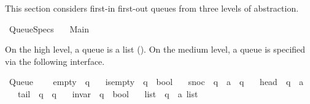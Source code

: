 %
\begin{isabellebody}%
%
%
\isadelimdocument
%
\endisadelimdocument
%
\isatagdocument
%
\isamarkuptrue%
%
\endisatagdocument
{\isafolddocument}%
%
\isadelimdocument
%
\endisadelimdocument
%
\begin{isamarkuptext}%
This section considers first-in first-out queues from three levels of abstraction.%
\end{isamarkuptext}\isamarkuptrue%
%
\isadelimtheory
%
\endisadelimtheory
%
\isatagtheory
{}\isamarkupfalse%
\ Queue{\isacharunderscore}{\kern0pt}Specs\isanewline
\ \ \ Main\isanewline
{}%
\endisatagtheory
{\isafoldtheory}%
%
\isadelimtheory
%
\endisadelimtheory
%
\begin{isamarkuptext}%
On the high level, a queue is a list (). On the medium level, a queue is specified via
the following interface.%
\end{isamarkuptext}\isamarkuptrue%
\isamarkupfalse%
\ Queue\ {\isacharequal}{\kern0pt}\isanewline
\ \ \ empty\ {\isacharcolon}{\kern0pt}{\isacharcolon}{\kern0pt}\ {\isachardoublequoteopen}{\isacharprime}{\kern0pt}q{\isachardoublequoteclose}\isanewline
\ \ \ is{\isacharunderscore}{\kern0pt}empty\ {\isacharcolon}{\kern0pt}{\isacharcolon}{\kern0pt}\ {\isachardoublequoteopen}{\isacharprime}{\kern0pt}q\ {\isasymRightarrow}\ bool{\isachardoublequoteclose}\isanewline
\ \ \ snoc\ {\isacharcolon}{\kern0pt}{\isacharcolon}{\kern0pt}\ {\isachardoublequoteopen}{\isacharprime}{\kern0pt}q\ {\isasymRightarrow}\ {\isacharprime}{\kern0pt}a\ {\isasymRightarrow}\ {\isacharprime}{\kern0pt}q{\isachardoublequoteclose}\isanewline
\ \ \ head\ {\isacharcolon}{\kern0pt}{\isacharcolon}{\kern0pt}\ {\isachardoublequoteopen}{\isacharprime}{\kern0pt}q\ {\isasymRightarrow}\ {\isacharprime}{\kern0pt}a{\isachardoublequoteclose}\isanewline
\ \ \ tail\ {\isacharcolon}{\kern0pt}{\isacharcolon}{\kern0pt}\ {\isachardoublequoteopen}{\isacharprime}{\kern0pt}q\ {\isasymRightarrow}\ {\isacharprime}{\kern0pt}q{\isachardoublequoteclose}\isanewline
\ \ \ invar\ {\isacharcolon}{\kern0pt}{\isacharcolon}{\kern0pt}\ {\isachardoublequoteopen}{\isacharprime}{\kern0pt}q\ {\isasymRightarrow}\ bool{\isachardoublequoteclose}\isanewline
\ \ \ list\ {\isacharcolon}{\kern0pt}{\isacharcolon}{\kern0pt}\ {\isachardoublequoteopen}{\isacharprime}{\kern0pt}q\ {\isasymRightarrow}\ {\isacharprime}{\kern0pt}a\ list{\isachardoublequoteclose}\isanewline

\end{isabellebody}
